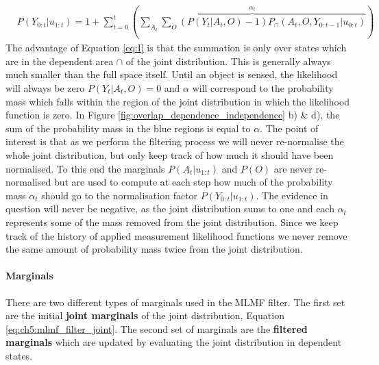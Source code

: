 \begin{align}\label{eq:I}
 &P(Y_{0:t}|u_{1:t})      	= 1 + \sum\limits_{t=0}^ t \left( \overbrace{\sum\limits_{A_t}\sum\limits_{O} (P(Y_t|A_t,O) - 1)P_{\cap}(A_t,O,Y_{0:t-1}|u_{0:t})}^{\alpha_t} \right)
\end{align}
The advantage of Equation \ref{eq:I} is that the summation is only over states which are in the dependent area $\cap$ of the joint 
distribution. This is generally always much smaller than the full space itself.
Until an object is sensed, the likelihood will always be zero $P(Y_t|A_t,O) = 0$ and $\alpha$ will correspond to the probability 
mass which falls within the region of the joint distribution in which the likelihood function is zero. In Figure 
\ref{fig:overlap_dependence_independence} b) \& d), the sum of the probability mass in the blue 
regions is equal to $\alpha$.
The point of interest is that as we perform the filtering process we will never re-normalise the whole joint distribution, but only keep 
track of how much it should have been normalised. To this end the marginals $P(A_t|u_{1:t})$ and $P(O)$  are never re-normalised but are used 
to compute at each step how much of the probability mass $\alpha_t$ should go to the normalisation factor $P(Y_{0:t}|u_{1:t})$. 
The evidence in question will never be negative, as the joint distribution sums to one and each $\alpha_t$ represents some of the mass removed from the joint distribution. Since we 
keep track of the history of applied  measurement likelihood functions we never remove the same amount of probability mass twice
from the joint distribution.

\paragraph{Marginals}

There are two different types of marginals used in the MLMF filter. The first set are the initial \textbf{joint marginals} of the joint distribution, Equation \ref{eq:ch5:mlmf_filter_joint}.
The second set of marginals are the \textbf{filtered marginals} which are updated by evaluating the joint distribution in dependent states.


\begin{center}
%
\end{center}

